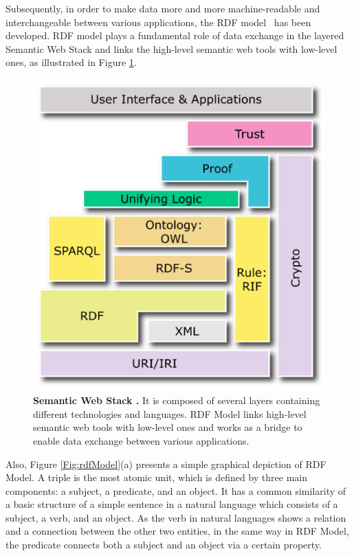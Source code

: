 Subsequently, in order to make data more and more machine-readable and interchangeable between various applications, the RDF model~\cite{W3C:RDF-Primer:Online} has been developed.  
RDF model plays a fundamental role of data exchange in the layered Semantic Web Stack and links the high-level semantic web tools with low-level ones, as illustrated in {Figure \ref{Fig:semanticWebStack}}. 
	\begin{figure}[ht]
	\begin{center}
	\setlength\belowcaptionskip{-7mm}
		\includegraphics[scale=0.5,angle=0]{images/semanticWebStack}
		\caption{\textbf{Semantic Web Stack \cite{W3C:SemanticStack:Online}.} It is composed of several layers containing different technologies and languages. 
		RDF Model links high-level semantic web tools with low-level ones and works as a bridge to enable data exchange between various applications.}
		\label{Fig:semanticWebStack}
	\end{center}
\end{figure}
\par
Also, {Figure \ref{Fig:rdfModel}}(a) presents a simple graphical depiction of RDF Model. 
A triple is the most atomic unit, which is defined by three main components: a subject, a predicate, and an object. 
It has a common similarity of a basic structure of a simple sentence in a natural language which consists of a subject, a verb, and an object. 
As the verb in natural languages shows a relation and a connection between the other two entities, in the same way in RDF Model, the predicate connects both a subject and an object via a certain property. 

